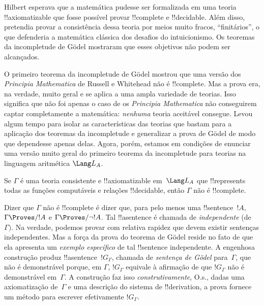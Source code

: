 \documentclass[../../../include/open-logic-section]{subfiles}
\begin{document}


Hilbert esperava que a matemática pudesse ser formalizada em uma
teoria !!{axiomatizable} que fosse possível provar !!{complete} e
!!{decidable}. Além disso, pretendia provar a consistência dessa teoria
por meios muito fracos, ``finitários'', o que defenderia a matemática
clássica dos desafios do intuicionismo. Os teoremas da incompletude de
G\"odel mostraram que esses objetivos não podem ser alcançados.

O primeiro teorema da incompletude de G\"odel mostrou que uma versão
dos \emph{Principia Mathematica} de Russell e Whitehead não é
!!{complete}. Mas a prova era, na verdade, muito geral e se aplica a
uma ampla variedade de teorias. Isso significa que não foi apenas o
caso de os \emph{Principia Mathematica} não conseguirem captar
completamente a matemática: \emph{nenhuma} teoria aceitável consegue.
Levou algum tempo para isolar as características das teorias que bastam
para a aplicação dos teoremas da incompletude e generalizar a prova de
G\"odel de modo que dependesse apenas delas. Agora, porém, estamos em
condições de enunciar uma versão muito geral do primeiro teorema da
incompletude para teorias na linguagem aritmética $\Lang L_A$.

\begin{thm}
Se $\Gamma$ é uma teoria consistente e !!{axiomatizable} em~$\Lang
L_A$ que !!{represents} todas as funções computáveis e relações
!!{decidable}, então $\Gamma$ não é !!{complete}.
\end{thm}

Dizer que $\Gamma$ não é !!{complete} é dizer que, para pelo menos uma
!!{sentence}~$!A$, $\Gamma \Proves/ !A$ e $\Gamma \Proves/ \lnot !A$.
Tal !!a{sentence} é chamada de \emph{independente} (de~$\Gamma)$. Na
verdade, podemos provar com relativa rapidez que devem existir
sentenças independentes. Mas a força da prova do teorema de G\"odel
reside no fato de que ela apresenta um \emph{exemplo específico} de
tal !!{sentence} independente. A engenhosa construção produz
!!a{sentence}~$!G_\Gamma$, chamada de \emph{sentença de G\"odel}
para~$\Gamma$, que não é demonstrável porque, em $\Gamma$,
$!G_\Gamma$ equivale à afirmação de que $!G_\Gamma$ não é demonstrável
em~$\Gamma$. A construção faz isso \emph{construtivamente}, O.s.\@,
dadas uma axiomatização de~$\Gamma$ e uma descrição do sistema de
!!{derivation}, a prova fornece um método para escrever efetivamente
$!G_\Gamma$.
\end{document}
